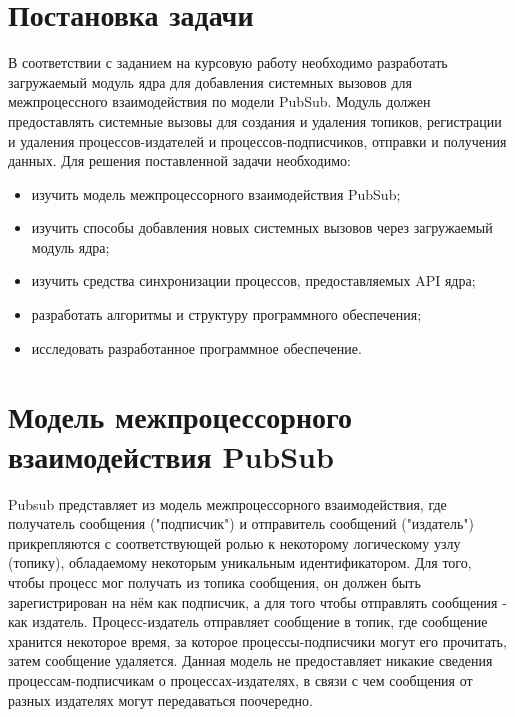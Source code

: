 \documentclass{bmstu}
\begin{document}
\section{Постановка задачи}
В соответствии с заданием на курсовую работу необходимо разработать загружаемый модуль ядра для добавления системных вызовов для межпроцессного взаимодействия по модели PubSub. Модуль должен предоставлять системные вызовы для создания и удаления топиков, регистрации и удаления процессов-издателей и процессов-подписчиков, отправки и получения данных.
Для решения поставленной задачи необходимо:
\begin{itemize}
	\item изучить модель межпроцессорного взаимодействия PubSub;
	\item изучить способы добавления новых системных вызовов через загружаемый модуль ядра;
	\item изучить средства синхронизации процессов, предоставляемых API ядра;
	\item разработать алгоритмы и структуру программного обеспечения;
	\item исследовать разработанное программное обеспечение.
\end{itemize}

\section{Модель межпроцессорного взаимодействия PubSub}
Pubsub представляет из модель межпроцессорного взаимодействия, где получатель сообщения ("подписчик") и отправитель сообщений ("издатель") прикрепляются с соответствующей ролью к некоторому логическому узлу (топику), обладаемому некоторым уникальным идентификатором. Для того, чтобы процесс мог получать из топика сообщения, он должен быть зарегистрирован на нём как подписчик, а для того чтобы отправлять сообщения - как издатель. Процесс-издатель отправляет сообщение в топик, где сообщение хранится некоторое время, за которое процессы-подписчики могут его прочитать, затем сообщение удаляется. Данная модель не предоставляет никакие сведения процессам-подписчикам о процессах-издателях, в связи с чем сообщения от разных издателях могут передаваться поочередно.
\end{document}
